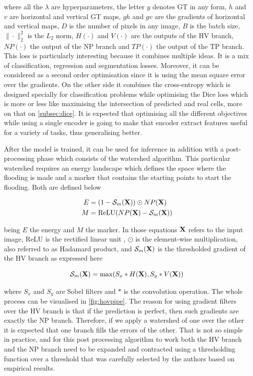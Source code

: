 \noindent where all the $\lambda$ are hyperparameters, the letter $y$ denotes GT in any form, $h$ and $v$ are horizontal and vertical GT maps, $gh$ and $gv$ are the gradients of horizontal and vertical maps, $D$ is the number of pixels in any image, $B$ is the batch size, $\| \cdot \|_2^2$ is the $L_2$ norm, $H(\cdot)$ and $V(\cdot)$ are the outputs of the HV branch, $NP(\cdot)$ the output of the NP branch and $TP(\cdot)$ the output of the TP branch. This loss is particularly interesting because it combines multiple ideas. It is a mix of classification, regression and segmentation losses. Moreover, it can be considered as a second order optimisation since it is using the mean square error over the gradients. On the other side it combines the cross-entropy which is designed specially for classification problems while optimising the Dice loss which is more or less like maximising the intersection of predicted and real cells, more on that on \autoref{subsec:dice}. It is expected that optimising all the different objectives while using a single encoder is going to make that encoder extract features useful for a variety of tasks, thus generalising better.

After the model is trained, it can be used for inference in addition with a post-processing phase which consists of the watershed algorithm. This particular watershed requires an energy landscape which defines the space where the flooding is made and a marker that contains the starting points to start the flooding. Both are defined below

\begin{align}
    E &= (1 - \mathcal{S}_m({\mathbf X})) \odot NP({\mathbf X}) \\
    M &= \text{ReLU}(NP({\mathbf X}) - \mathcal{S}_m({\mathbf X}))
\end{align}

\noindent being $E$ the energy and $M$ the marker. In those equations ${\mathbf X}$ refers to the input image, ReLU is the rectified linear unit \cite{relu}, $\odot$ is the element-wise multiplication, also referred to as Hadamard product, and $\mathcal{S}_m({\mathbf X})$ is the thresholded gradient of the HV branch as expressed here

\begin{equation}
    \mathcal{S}_m({\mathbf X}) = \max(S_x * H({\mathbf X}), S_y * V({\mathbf X}))
\end{equation}

\noindent where $S_x$ and $S_y$ are Sobel filters \cite{sobel} and $*$ is the convolution operation. The whole process can be visualised in \autoref{fig:hovpipe}. The reason for using gradient filters over the HV branch is that if the prediction is perfect, then such gradients are exactly the NP branch. Therefore, if we apply a watershed of one over the other it is expected that one branch fills the errors of the other. That is not so simple in practice, and for this post processing algorithm to work both the HV branch and the NP branch need to be expanded and contracted using a thresholding function over a threshold that was carefully selected by the authors based on empirical results.

